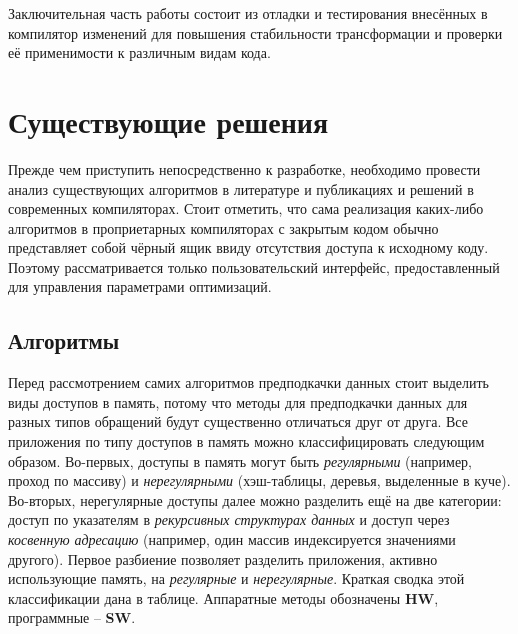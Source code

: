 \documentclass[12pt,a4paper]{article}
\begin{document}
Заключительная часть работы состоит из отладки и тестирования внесённых в компилятор изменений для повышения стабильности трансформации и проверки её применимости к различным видам кода.

\section{Существующие решения}

\indent

Прежде чем приступить непосредственно к разработке, необходимо провести анализ существующих алгоритмов в литературе и публикациях и решений в современных компиляторах. Стоит отметить, что сама реализация каких-либо алгоритмов в проприетарных компиляторах с закрытым кодом обычно представляет собой чёрный ящик ввиду отсутствия доступа к исходному коду. Поэтому рассматривается только пользовательский интерфейс, предоставленный для управления параметрами оптимизаций.

\subsection{Алгоритмы}

\indent

Перед рассмотрением самих алгоритмов предподкачки данных стоит выделить виды доступов в память, потому что методы для предподкачки данных для разных типов обращений будут существенно отличаться друг от друга. Все приложения по типу доступов в память можно классифицировать следующим образом\cite{LeeMemClass}. Во-первых, доступы в память могут быть \emph{регулярными} (например, проход по массиву) и \emph{нерегулярными} (хэш-таблицы, деревья, выделенные в куче). Во-вторых, нерегулярные доступы далее можно разделить ещё на две категории: доступ по указателям в \emph{рекурсивных структурах данных} и доступ через \emph{косвенную адресацию} (например, один массив индексируется значениями другого). Первое разбиение позволяет разделить приложения, активно использующие память, на \emph{регулярные} и \emph{нерегулярные}. Краткая сводка этой классификации дана в таблице. Аппаратные методы обозначены \textbf{HW}, программные -- \textbf{SW}.
\end{document}
